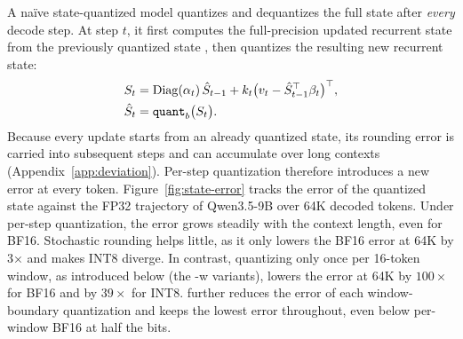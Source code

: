 A na\"ive state-quantized model quantizes and dequantizes the full state after \emph{every} decode step.
At step $t$, it first computes the full-precision updated recurrent state  from the previously quantized state , then quantizes the resulting new recurrent state:
\begin{equation}
  \begin{aligned}
    S_t &= \operatorname{Diag}(\alpha_t)\,\hat S_{t-1}
       + k_t\bigl(v_t-\hat S_{t-1}^{\top}\beta_t\bigr)^{\top},\\
    \hat S_t &= \operatorname{\mathtt{quant}}_b\bigl(S_t\bigr).
  \end{aligned}
  \label{eq:naive}
\end{equation}
%
\noindent Because every update starts from an already quantized state, its rounding error is carried into subsequent steps and can accumulate over long contexts (Appendix~\ref{app:deviation}).
Per-step quantization therefore introduces a new error at every token.
Figure~\ref{fig:state-error} tracks the error of the quantized state against the FP32 trajectory of Qwen3.5-9B over 64K decoded tokens.
Under per-step quantization, the error grows steadily with the context length, even for BF16.
Stochastic rounding helps little, as it only lowers the BF16 error at 64K by 3× and makes INT8 diverge.
In contrast, quantizing only once per 16-token window, as introduced below (the -w variants), lowers the error at 64K by $100\times$ for BF16 and by $39\times$ for INT8.
\method{} further reduces the error of each window-boundary quantization and keeps the lowest error throughout, even below per-window BF16 at half the bits.

